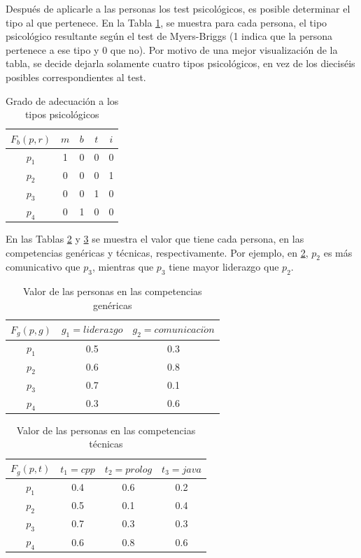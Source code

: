 Después de aplicarle a las personas los test psicológicos, es posible determinar el tipo al que pertenece. En la Tabla \ref{prps-sof}, se muestra para cada persona, el tipo psicológico resultante según el test de Myers-Briggs (1 indica que la persona pertenece a ese tipo y 0 que no). Por motivo de una mejor visualización de la tabla, se decide dejarla solamente cuatro tipos psicológicos, en vez de los dieciséis posibles correspondientes al test.
\begin{table}[H]
  \centering
  \caption{Grado de adecuación a los tipos psicológicos}\label{prps-sof}
\begin{tabular}{|c|c|c|c|c|}
	\hline
	$F_b(p,r)$ & $m$ & $b$ & $t$ & $i$ \\ \hline
	  $p_1$    &  1  &  0  &  0  &  0  \\ \hline
	  $p_2$    &  0  &  0  &  0  &  1  \\ \hline
	  $p_3$    &  0  &  0  &  1  &  0  \\ \hline
	  $p_4$    &  0  &  1  &  0  &  0  \\ \hline
\end{tabular}
\end{table}


En las Tablas \ref{pcg-sof} y \ref{pct-sof} se muestra el valor que tiene cada persona, en las competencias genéricas y técnicas, respectivamente. Por ejemplo, en \ref{pcg-sof}, $p_2$ es más comunicativo que $p_3$, mientras que $p_3$ tiene mayor liderazgo que $p_2$.


\begin{table}[H]
	\centering
	\caption{Valor de las personas en las competencias genéricas}\label{pcg-sof}
	\begin{tabular}{|c|c|c|}
		\hline
		$F_g(p,g)$ & $g_1=liderazgo$ & $g_2=comunicaci\acute{o}n$ \\ \hline
		  $p_1$    &       0.5       &            0.3             \\ \hline
		  $p_2$    &       0.6       &            0.8             \\ \hline
		  $p_3$    &       0.7       &            0.1             \\ \hline
		  $p_4$    &       0.3       &            0.6             \\ \hline
	\end{tabular}
\end{table}

\begin{table}[H]
	\centering
	\caption{Valor de las personas en las competencias técnicas}\label{pct-sof}
	\begin{tabular}{|c|c|c|c|}
		\hline
		$F_g(p,t)$ & $t_1=cpp$ & $t_2=prolog$ & $t_3=java$ \\ \hline
		  $p_1$    &    0.4    &     0.6      &    0.2     \\ \hline
		  $p_2$    &    0.5    &     0.1      &    0.4     \\ \hline
		  $p_3$    &    0.7    &     0.3      &    0.3     \\ \hline
		  $p_4$    &    0.6    &     0.8      &    0.6     \\ \hline
	\end{tabular}
\end{table}

